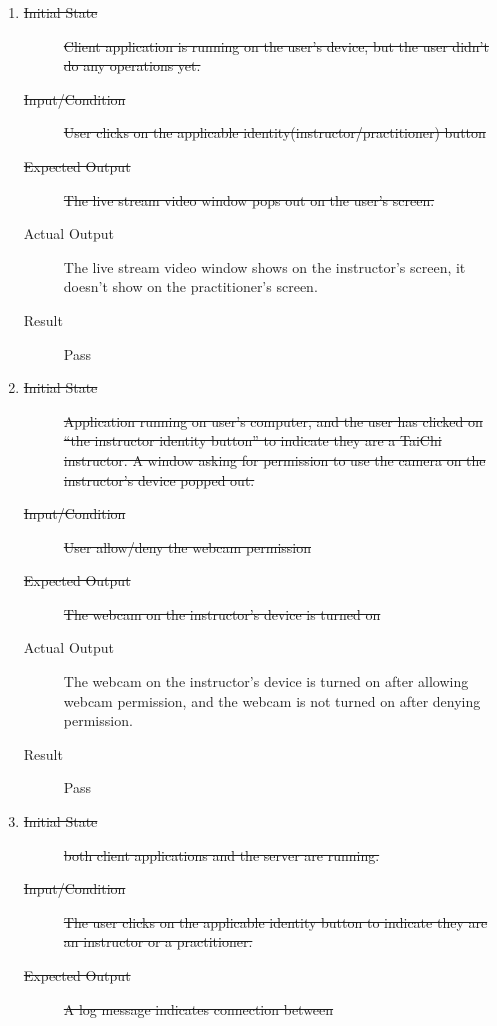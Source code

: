 \documentclass[12pt, titlepage]{article}
\begin{document}
\begin{enumerate}[FR-T1]
  \item \label{FRT1}
    \begin{description}
    \item[\sout{Initial State}] \sout{Client application is running on the user's
        device, but the user didn’t do any operations yet.}
		\item[\sout{Input/Condition}] \sout{User clicks on the applicable
        identity(instructor/practitioner) button}
		\item[\sout{Expected Output}] \sout{The live stream video window pops out on
        the user's screen.}
		\item[Actual Output] The live stream video window shows on the instructor's
      screen, it doesn't show on the practitioner's screen.
    \item[Result] Pass
    \end{description}
  \item \label{FRT2}
    \begin{description}
    \item[\sout{Initial State}] \sout{Application running on user’s computer, and
        the user has clicked on “the instructor identity button” to indicate
        they are a TaiChi instructor. A window asking for permission to use the
        camera on the instructor's device popped out.}
		\item[\sout{Input/Condition}] \sout{User allow/deny the webcam permission}
		\item[\sout{Expected Output}] \sout{The webcam on the instructor’s device is
        turned on}
		\item[Actual Output] The webcam on the instructor’s device is turned on after
      allowing webcam permission, and the webcam is not turned on after denying
      permission.
    \item[Result] Pass
    \end{description}
  \item \label{FRT3}
    \begin{description}
    \item[\sout{Initial State}] \sout{both client applications and the server are
        running.}
		\item[\sout{Input/Condition}] \sout{The user clicks on the applicable identity
        button to indicate they are an instructor or a practitioner.}
		\item[\sout{Expected Output}] \sout{A log message indicates connection between
}
\end{description}
\end{enumerate}
\end{document}

